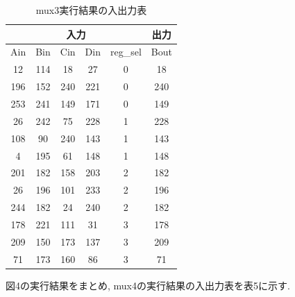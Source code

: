 \documentclass[12pt]{jreport}
\begin{document}
            \begin{table}[htb]
              \begin{center}
                \caption{mux3実行結果の入出力表}
                \begin{tabular} {|c|c|c|c|c|c|} \hline
                  \multicolumn{5}{|c|}{入力} & 出力 \\ \hline \hline
                        Ain & Bin & Cin & Din & reg\_sel & Bout \\ \hline
                        12 & 114 & 18 & 27 & 0 & 18 \\ \hline
                        196 & 152 & 240 & 221 & 0 & 240 \\ \hline
                        253 & 241 & 149 & 171 & 0 & 149 \\ \hline

                        26 & 242 & 75 & 228 & 1 & 228 \\ \hline
                        108 & 90 & 240 & 143 & 1 & 143 \\ \hline
                        4 &  195 & 61 & 148 & 1 & 148 \\ \hline

                        201 & 182 & 158 & 203 & 2 & 182 \\ \hline
                        26 & 196 & 101 & 233 & 2 & 196 \\ \hline
                        244 & 182 & 24 & 240 & 2 & 182 \\ \hline

                        178 & 221 & 111 & 31 & 3 & 178 \\ \hline
                        209 & 150 & 173 & 137 & 3 & 209 \\ \hline
                        71 & 173 & 160 & 86 & 3 & 71 \\ \hline

                \end{tabular}
              \end{center}
            \end{table}
            \newpage
            図4の実行結果をまとめ, mux4の実行結果の入出力表を表5に示す. 
\end{document}
